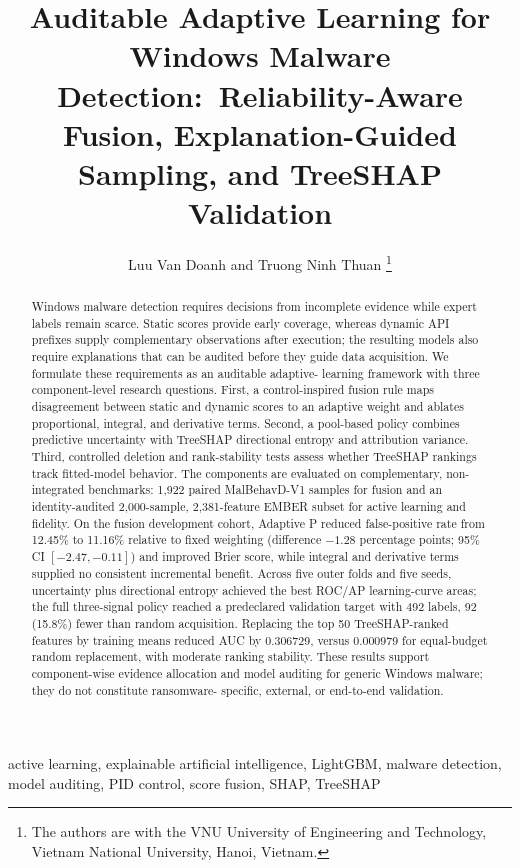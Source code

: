 \documentclass[journal]{IEEEtran}
\title{Auditable Adaptive Learning for Windows Malware Detection:\
Reliability-Aware Fusion, Explanation-Guided Sampling, and TreeSHAP Validation}
\author{Luu Van Doanh and Truong Ninh Thuan%
\thanks{The authors are with the VNU University of Engineering and Technology,
Vietnam National University, Hanoi, Vietnam.}%
}
\begin{document}
\maketitle

\begin{abstract}
Windows malware detection requires decisions from incomplete evidence while
expert labels remain scarce. Static scores provide early coverage, whereas
dynamic API prefixes supply complementary observations after execution; the
resulting models also require explanations that can be audited before they guide
data acquisition. We formulate these requirements as an auditable adaptive-
learning framework with three component-level research questions. First, a
control-inspired fusion rule maps disagreement between static and dynamic scores
to an adaptive weight and ablates proportional, integral, and derivative terms.
Second, a pool-based policy combines predictive uncertainty with TreeSHAP
directional entropy and attribution variance. Third, controlled deletion and
rank-stability tests assess whether TreeSHAP rankings track fitted-model
behavior. The components are evaluated on complementary, non-integrated
benchmarks: 1,922 paired MalBehavD-V1 samples for fusion and an identity-audited
2,000-sample, 2,381-feature EMBER subset for active learning and fidelity. On the
fusion development cohort, Adaptive P reduced false-positive rate from 12.45\%
to 11.16\% relative to fixed weighting (difference $-1.28$ percentage points;
95\% CI $[-2.47,-0.11]$) and improved Brier score, while integral and derivative
terms supplied no consistent incremental benefit. Across five outer folds and
five seeds, uncertainty plus directional entropy achieved the best ROC/AP
learning-curve areas; the full three-signal policy reached a predeclared
validation target with 492 labels, 92 (15.8\%) fewer than random acquisition.
Replacing the top 50 TreeSHAP-ranked features by training means reduced AUC by
0.306729, versus 0.000979 for equal-budget random replacement, with moderate
ranking stability. These results support component-wise evidence allocation and
model auditing for generic Windows malware; they do not constitute ransomware-
specific, external, or end-to-end validation.
\end{abstract}

\begin{IEEEkeywords}
active learning, explainable artificial intelligence, LightGBM, malware
detection, model auditing, PID control, score fusion, SHAP, TreeSHAP
\end{IEEEkeywords}











\appendices

\clearpage



\end{document}
